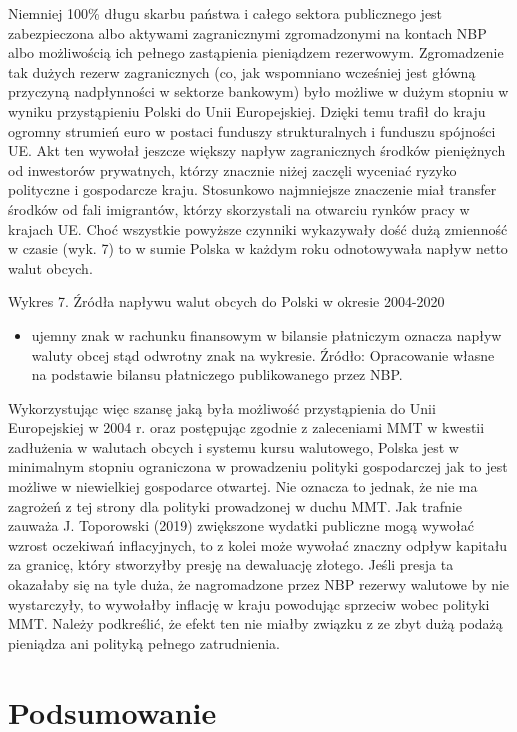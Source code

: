 \documentclass[
]{book}
\providecommand{\tightlist}{%
  \setlength{\itemsep}{0pt}\setlength{\parskip}{0pt}}
\begin{document}
Niemniej 100\% długu skarbu państwa i całego sektora publicznego jest zabezpieczona albo aktywami zagranicznymi zgromadzonymi na kontach NBP albo możliwością ich pełnego zastąpienia pieniądzem rezerwowym. Zgromadzenie tak dużych rezerw zagranicznych (co, jak wspomniano wcześniej jest główną przyczyną nadpłynności w sektorze bankowym) było możliwe w dużym stopniu w wyniku przystąpieniu Polski do Unii Europejskiej. Dzięki temu trafił do kraju ogromny strumień euro w postaci funduszy strukturalnych i funduszu spójności UE. Akt ten wywołał jeszcze większy napływ zagranicznych środków pieniężnych od inwestorów prywatnych, którzy znacznie niżej zaczęli wyceniać ryzyko polityczne i gospodarcze kraju. Stosunkowo najmniejsze znaczenie miał transfer środków od fali imigrantów, którzy skorzystali na otwarciu rynków pracy w krajach UE. Choć wszystkie powyższe czynniki wykazywały dość dużą zmienność w czasie (wyk. 7) to w sumie Polska w każdym roku odnotowywała napływ netto walut obcych.

Wykres 7. Źródła napływu walut obcych do Polski w okresie 2004-2020

\begin{itemize}
\tightlist
\item
  ujemny znak w rachunku finansowym w bilansie płatniczym oznacza napływ waluty obcej stąd odwrotny znak na wykresie. Źródło: Opracowanie własne na podstawie bilansu płatniczego publikowanego przez NBP.
\end{itemize}

Wykorzystując więc szansę jaką była możliwość przystąpienia do Unii Europejskiej w 2004 r. oraz postępując zgodnie z zaleceniami MMT w kwestii zadłużenia w walutach obcych i systemu kursu walutowego, Polska jest w minimalnym stopniu ograniczona w prowadzeniu polityki gospodarczej jak to jest możliwe w niewielkiej gospodarce otwartej. Nie oznacza to jednak, że nie ma zagrożeń z tej strony dla polityki prowadzonej w duchu MMT. Jak trafnie zauważa J. Toporowski (2019) zwiększone wydatki publiczne mogą wywołać wzrost oczekiwań inflacyjnych, to z kolei może wywołać znaczny odpływ kapitału za granicę, który stworzyłby presję na dewaluację złotego. Jeśli presja ta okazałaby się na tyle duża, że nagromadzone przez NBP rezerwy walutowe by nie wystarczyły, to wywołałby inflację w kraju powodując sprzeciw wobec polityki MMT. Należy podkreślić, że efekt ten nie miałby związku z ze zbyt dużą podażą pieniądza ani polityką pełnego zatrudnienia.

\hypertarget{podsumowanie}{%
\section{Podsumowanie}\label{podsumowanie}}
\end{document}
